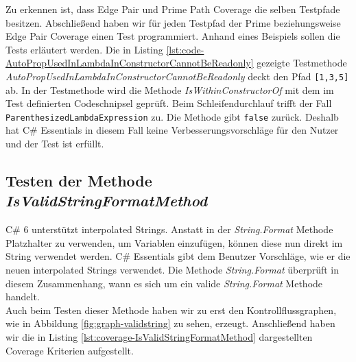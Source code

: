 \vspace{3ex}
Zu erkennen ist, dass Edge Pair und Prime Path Coverage die selben Testpfade besitzen. Abschließend haben wir für jeden Testpfad der Prime beziehungsweise Edge Pair Coverage einen Test programmiert. Anhand eines Beispiels sollen die Tests erläutert werden. Die in Listing \ref{lst:code-AutoPropUsedInLambdaInConstructorCannotBeReadonly} gezeigte Testmethode \textit{AutoPropUsedInLambdaInConstructorCannotBeReadonly} deckt den Pfad \texttt{[1,3,5]} ab. In der Testmethode wird die Methode \textit{IsWithinConstructorOf} mit dem im Test definierten Codeschnipsel geprüft. Beim Schleifendurchlauf trifft der Fall \texttt{ParenthesizedLambdaExpression} zu. Die Methode gibt \texttt{false} zurück. Deshalb hat C\# Essentials in diesem Fall keine Verbesserungsvorschläge für den Nutzer und der Test ist erfüllt.


\subsection{Testen der Methode \textit{IsValidStringFormatMethod}}
C\# 6 unterstützt interpolated Strings. Anstatt in der \textit{String.Format} Methode Platzhalter zu verwenden, um Variablen einzufügen, können diese nun direkt im String verwendet werden.\cite{csharp6} C\# Essentials gibt dem Benutzer Vorschläge, wie er die neuen interpolated Strings verwendet. Die Methode \textit{String.Format} überprüft in diesem Zusammenhang, wann es sich um ein valide \textit{String.Format} Methode handelt.\\
Auch beim Testen dieser Methode haben wir zu erst den Kontrollflussgraphen, wie in Abbildung \ref{fig:graph-validstring} zu sehen, erzeugt. Anschließend haben wir die in Listing \ref{lst:coverage-IsValidStringFormatMethod} dargestellten Coverage Kriterien aufgestellt.

